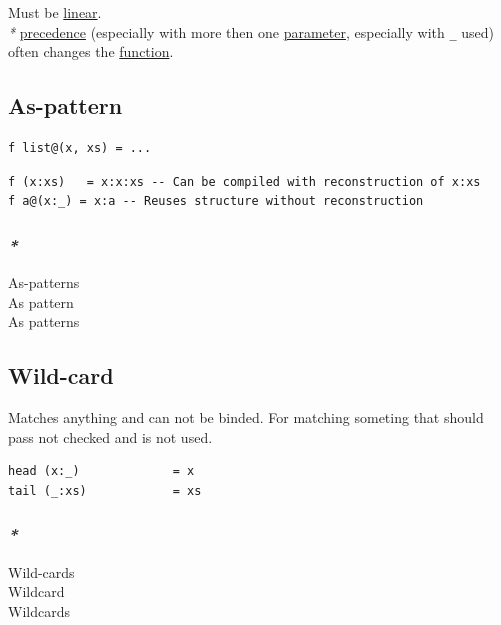 \documentclass[a4paper,14pt,oneside]{book}
\begin{document}
{Must be \hyperref[org059a25a]{linear}.\\

\emph{*} \hyperref[org578544e]{precedence} (especially with more then one \hyperref[org0db8baa]{parameter}, especially with \texttt{\_} used) often changes the \hyperref[org6a60524]{function}.\\

\subsection{\label{org53ef7d1}As-pattern}
\label{sec:orgd7dee91}
\begin{verbatim}
f list@(x, xs) = ...
\end{verbatim}

\begin{verbatim}
f (x:xs)   = x:x:xs -- Can be compiled with reconstruction of x:xs
f a@(x:_) = x:a -- Reuses structure without reconstruction
\end{verbatim}

\subsubsection{\emph{*}}
\label{sec:orgfd79141}

\label{org6c843b5}As-patterns\\
\label{org27f0795}As pattern\\
\label{org502a2d6}As patterns\\

\subsection{\label{orgd445279}Wild-card}
\label{sec:org89ca9e5}
Matches anything and can not be binded. For matching someting that should pass not checked and is not used.\\

\begin{verbatim}
head (x:_)             = x
tail (_:xs)            = xs
\end{verbatim}

\subsubsection{\emph{*}}
\label{sec:org0e8c9dd}
\label{org7b4d4da}Wild-cards\\
\label{org7d1a456}Wildcard\\
\label{orgbaf1b8d}Wildcards\\

}
\end{document}
